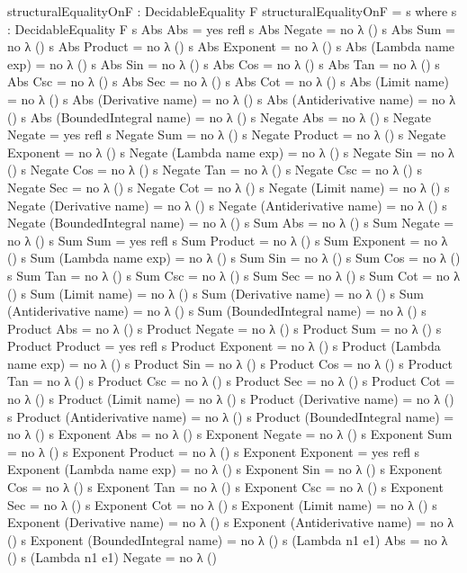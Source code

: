 \documentclass{report}
\begin{document}
\begin{code}
structuralEqualityOnF : DecidableEquality F
structuralEqualityOnF = s
  where
  s : DecidableEquality F
  s Abs Abs = yes refl
  s Abs Negate = no λ ()
  s Abs Sum = no λ ()
  s Abs Product = no λ ()
  s Abs Exponent = no λ ()
  s Abs (Lambda name exp) = no λ ()
  s Abs Sin = no λ ()
  s Abs Cos = no λ ()
  s Abs Tan = no λ ()
  s Abs Csc = no λ ()
  s Abs Sec = no λ ()
  s Abs Cot = no λ ()
  s Abs (Limit name) = no λ ()
  s Abs (Derivative name) = no λ ()
  s Abs (Antiderivative name) = no λ ()
  s Abs (BoundedIntegral name) = no λ ()
  s Negate Abs = no λ ()
  s Negate Negate = yes refl
  s Negate Sum = no λ ()
  s Negate Product = no λ ()
  s Negate Exponent = no λ ()
  s Negate (Lambda name exp) = no λ ()
  s Negate Sin = no λ ()
  s Negate Cos = no λ ()
  s Negate Tan = no λ ()
  s Negate Csc = no λ ()
  s Negate Sec = no λ ()
  s Negate Cot = no λ ()
  s Negate (Limit name) = no λ ()
  s Negate (Derivative name) = no λ ()
  s Negate (Antiderivative name) = no λ ()
  s Negate (BoundedIntegral name) = no λ ()
  s Sum Abs = no λ ()
  s Sum Negate = no λ ()
  s Sum Sum = yes refl
  s Sum Product = no λ ()
  s Sum Exponent = no λ ()
  s Sum (Lambda name exp) = no λ ()
  s Sum Sin = no λ ()
  s Sum Cos = no λ ()
  s Sum Tan = no λ ()
  s Sum Csc = no λ ()
  s Sum Sec = no λ ()
  s Sum Cot = no λ ()
  s Sum (Limit name) = no λ ()
  s Sum (Derivative name) = no λ ()
  s Sum (Antiderivative name) = no λ ()
  s Sum (BoundedIntegral name) = no λ ()
  s Product Abs = no λ ()
  s Product Negate = no λ ()
  s Product Sum = no λ ()
  s Product Product = yes refl
  s Product Exponent = no λ ()
  s Product (Lambda name exp) = no λ ()
  s Product Sin = no λ ()
  s Product Cos = no λ ()
  s Product Tan = no λ ()
  s Product Csc = no λ ()
  s Product Sec = no λ ()
  s Product Cot = no λ ()
  s Product (Limit name) = no λ ()
  s Product (Derivative name) = no λ ()
  s Product (Antiderivative name) = no λ ()
  s Product (BoundedIntegral name) = no λ ()
  s Exponent Abs = no λ ()
  s Exponent Negate = no λ ()
  s Exponent Sum = no λ ()
  s Exponent Product = no λ ()
  s Exponent Exponent = yes refl
  s Exponent (Lambda name exp) = no λ ()
  s Exponent Sin = no λ ()
  s Exponent Cos = no λ ()
  s Exponent Tan = no λ ()
  s Exponent Csc = no λ ()
  s Exponent Sec = no λ ()
  s Exponent Cot = no λ ()
  s Exponent (Limit name) = no λ ()
  s Exponent (Derivative name) = no λ ()
  s Exponent (Antiderivative name) = no λ ()
  s Exponent (BoundedIntegral name) = no λ ()
  s (Lambda n1 e1) Abs = no λ ()
  s (Lambda n1 e1) Negate = no λ ()

\end{code}
\end{document}
